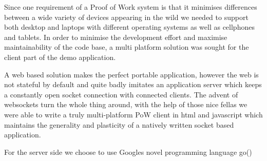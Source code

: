 Since one requirement of a Proof of Work system is that it minimises differences between a wide variety of devices appearing in the wild we needed to support both desktop and laptops with different operating systems as well as cellphones and tablets.
In order to minimise the development effort and maximise maintainability of the code base, a multi platform solution was sought for the client part of the demo application. 

A web based solution makes the perfect portable application, however the web is not stateful by default and quite badly imitates an application server which keeps a constantly open socket connection with connected clients. The advent of websockets turn the whole thing around, with the help of those nice fellas we were able to write a truly multi-platform PoW client in html and javascript which maintains the generality and plasticity of a natively written socket based application. 

For the server side we choose to use Googles novel programming language go()